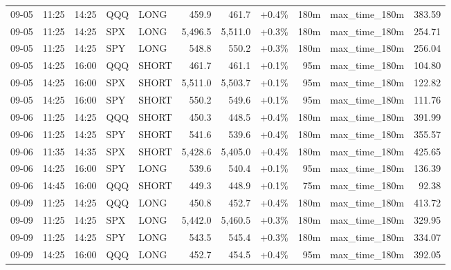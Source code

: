 \documentclass[11pt,a4paper,twoside]{article}
\begin{document}
\begin{center}
\begin{longtable}{>{\color{txtmain}}l l l l l r r r r >{\color{txtmain}}l r}
09-05 & 11:25 & 14:25 & QQQ & LONG & 459.9 & 461.7 & \textcolor{wingreen}{+0.4\%} & 180m & max\_time\_180m & \textcolor{wingreen}{383.59} \\
09-05 & 11:25 & 14:25 & SPX & LONG & 5,496.5 & 5,511.0 & \textcolor{wingreen}{+0.3\%} & 180m & max\_time\_180m & \textcolor{wingreen}{254.71} \\
09-05 & 11:25 & 14:25 & SPY & LONG & 548.8 & 550.2 & \textcolor{wingreen}{+0.3\%} & 180m & max\_time\_180m & \textcolor{wingreen}{256.04} \\
09-05 & 14:25 & 16:00 & QQQ & SHORT & 461.7 & 461.1 & \textcolor{wingreen}{+0.1\%} & 95m & max\_time\_180m & \textcolor{wingreen}{104.80} \\
09-05 & 14:25 & 16:00 & SPX & SHORT & 5,511.0 & 5,503.7 & \textcolor{wingreen}{+0.1\%} & 95m & max\_time\_180m & \textcolor{wingreen}{122.82} \\
09-05 & 14:25 & 16:00 & SPY & SHORT & 550.2 & 549.6 & \textcolor{wingreen}{+0.1\%} & 95m & max\_time\_180m & \textcolor{wingreen}{111.76} \\
09-06 & 11:25 & 14:25 & QQQ & SHORT & 450.3 & 448.5 & \textcolor{wingreen}{+0.4\%} & 180m & max\_time\_180m & \textcolor{wingreen}{391.99} \\
09-06 & 11:25 & 14:25 & SPY & SHORT & 541.6 & 539.6 & \textcolor{wingreen}{+0.4\%} & 180m & max\_time\_180m & \textcolor{wingreen}{355.57} \\
09-06 & 11:35 & 14:35 & SPX & SHORT & 5,428.6 & 5,405.0 & \textcolor{wingreen}{+0.4\%} & 180m & max\_time\_180m & \textcolor{wingreen}{425.65} \\
09-06 & 14:25 & 16:00 & SPY & LONG & 539.6 & 540.4 & \textcolor{wingreen}{+0.1\%} & 95m & max\_time\_180m & \textcolor{wingreen}{136.39} \\
09-06 & 14:45 & 16:00 & QQQ & SHORT & 449.3 & 448.9 & \textcolor{wingreen}{+0.1\%} & 75m & max\_time\_180m & \textcolor{wingreen}{92.38} \\
09-09 & 11:25 & 14:25 & QQQ & LONG & 450.8 & 452.7 & \textcolor{wingreen}{+0.4\%} & 180m & max\_time\_180m & \textcolor{wingreen}{413.72} \\
09-09 & 11:25 & 14:25 & SPX & LONG & 5,442.0 & 5,460.5 & \textcolor{wingreen}{+0.3\%} & 180m & max\_time\_180m & \textcolor{wingreen}{329.95} \\
09-09 & 11:25 & 14:25 & SPY & LONG & 543.5 & 545.4 & \textcolor{wingreen}{+0.3\%} & 180m & max\_time\_180m & \textcolor{wingreen}{334.07} \\
09-09 & 14:25 & 16:00 & QQQ & LONG & 452.7 & 454.5 & \textcolor{wingreen}{+0.4\%} & 95m & max\_time\_180m & \textcolor{wingreen}{392.05} \\

\end{longtable}
\end{center}
\end{document}
